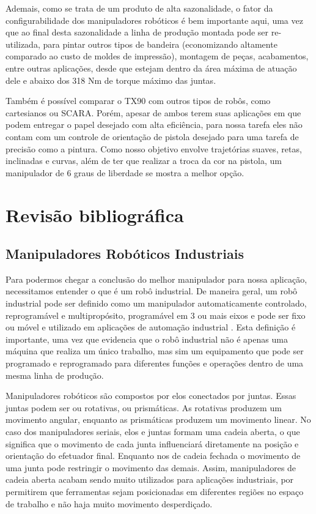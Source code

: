 Ademais, como se trata de um produto de alta sazonalidade, o fator da configurabilidade dos manipuladores robóticos é bem importante aqui, uma vez que ao final desta sazonalidade a linha de produção montada pode ser re-utilizada, para pintar outros tipos de bandeira (economizando altamente comparado ao custo de moldes de impressão), montagem de peças, acabamentos, entre outras aplicações, desde que estejam dentro da área máxima de atuação dele e abaixo dos 318 Nm de torque máximo das juntas.

Também é possível comparar o TX90 com outros tipos de robôs, como cartesianos ou SCARA. Porém, apesar de ambos terem suas aplicações em que podem entregar o papel desejado com alta eficiência, para nossa tarefa eles não contam com um controle de orientação de pistola desejado para uma tarefa de precisão como a pintura. Como nosso objetivo envolve trajetórias suaves, retas, inclinadas e curvas, além de ter que realizar a troca da cor na pistola, um manipulador de 6 graus de liberdade se mostra a melhor opção.

\section{Revisão bibliográfica}

\subsection{Manipuladores Robóticos Industriais}

Para podermos chegar a conclusão do melhor manipulador para nossa aplicação, necessitamos entender o que é um robô industrial. De maneira geral, um robô industrial pode ser definido como um manipulador automaticamente controlado, reprogramável e multipropósito, programável em 3 ou mais eixos e pode ser fixo ou móvel e utilizado em aplicações de automação industrial \cite{ifr2026}. Esta definição é importante, uma vez que evidencia que o robô industrial não é apenas uma máquina que realiza um único trabalho, mas sim um equipamento que pode ser programado e reprogramado para diferentes funções e operações dentro de uma mesma linha de produção.

Manipuladores robóticos são compostos por elos conectados por juntas. Essas juntas podem ser ou rotativas, ou prismáticas. As rotativas produzem um movimento angular, enquanto as prismáticas produzem um movimento linear. No caso dos manipuladores seriais, elos e juntas formam uma cadeia aberta, o que significa que o movimento de cada junta influenciará diretamente na posição e orientação do efetuador final. Enquanto nos de cadeia fechada o movimento de uma junta pode restringir o movimento das demais. Assim, manipuladores de cadeia aberta acabam sendo muito utilizados para aplicações industriais, por permitirem que ferramentas sejam posicionadas em diferentes regiões no espaço de trabalho e não haja muito movimento desperdiçado.

